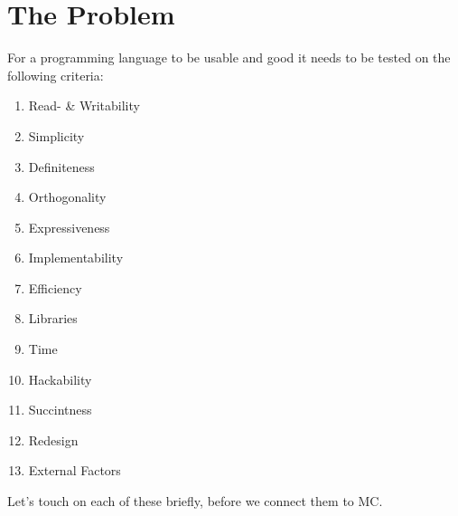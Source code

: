 \chapter{The Problem}
  For a programming language to be usable and good it needs to be tested on  the following criteria:\cite{khedker1997makes,graham2004hackers}

\begin{multicols}{3}
\begin{enumerate}
  \item Read- \& Writability
  \item Simplicity
  \item Definiteness
  \item Orthogonality
  \item Expressiveness
  \item Implementability
  \item Efficiency
  \item Libraries
  \item Time
  \item Hackability
  \item Succintness
  \item Redesign
  \item External Factors
\end{enumerate}
\end{multicols}
Let's touch on each of these briefly, before we connect them to MC.

